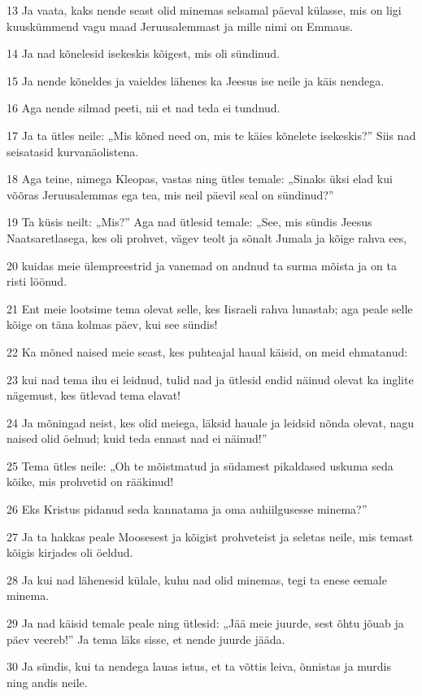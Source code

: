 \par 13 Ja vaata, kaks nende seast olid minemas selsamal päeval külasse, mis on ligi kuuskümmend vagu maad Jeruusalemmast ja mille nimi on Emmaus.
\par 14 Ja nad kõnelesid isekeskis kõigest, mis oli sündinud.
\par 15 Ja nende kõneldes ja vaieldes lähenes ka Jeesus ise neile ja käis nendega.
\par 16 Aga nende silmad peeti, nii et nad teda ei tundnud.
\par 17 Ja ta ütles neile: „Mis kõned need on, mis te käies kõnelete isekeskis?” Siis nad seisatasid kurvanäolistena.
\par 18 Aga teine, nimega Kleopas, vastas ning ütles temale: „Sinaks üksi elad kui võõras Jeruusalemmas ega tea, mis neil päevil seal on sündinud?”
\par 19 Ta küsis neilt: „Mis?” Aga nad ütlesid temale: „See, mis sündis Jeesus Naatsaretlasega, kes oli prohvet, vägev teolt ja sõnalt Jumala ja kõige rahva ees,
\par 20 kuidas meie ülempreestrid ja vanemad on andnud ta surma mõista ja on ta risti löönud.
\par 21 Ent meie lootsime tema olevat selle, kes Iisraeli rahva lunastab; aga peale selle kõige on täna kolmas päev, kui see sündis!
\par 22 Ka mõned naised meie seast, kes puhteajal haual käisid, on meid ehmatanud:
\par 23 kui nad tema ihu ei leidnud, tulid nad ja ütlesid endid näinud olevat ka inglite nägemust, kes ütlevad tema elavat!
\par 24 Ja mõningad neist, kes olid meiega, läksid hauale ja leidsid nõnda olevat, nagu naised olid öelnud; kuid teda ennast nad ei näinud!”
\par 25 Tema ütles neile: „Oh te mõistmatud ja südamest pikaldased uskuma seda kõike, mis prohvetid on rääkinud!
\par 26 Eks Kristus pidanud seda kannatama ja oma auhiilgusesse minema?”
\par 27 Ja ta hakkas peale Moosesest ja kõigist prohveteist ja seletas neile, mis temast kõigis kirjades oli öeldud.
\par 28 Ja kui nad lähenesid külale, kuhu nad olid minemas, tegi ta enese eemale minema.
\par 29 Ja nad käisid temale peale ning ütlesid: „Jää meie juurde, sest õhtu jõuab ja päev veereb!” Ja tema läks sisse, et nende juurde jääda.
\par 30 Ja sündis, kui ta nendega lauas istus, et ta võttis leiva, õnnistas ja murdis ning andis neile.
